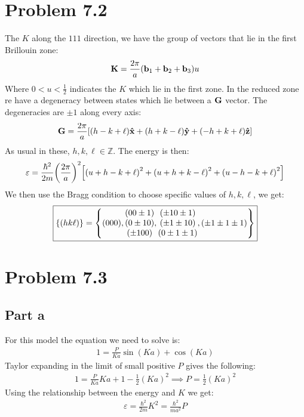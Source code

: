 \documentclass[12pt]{article}
\begin{document}
\section{Problem 7.2}
The $K$ along the $111$ direction, we have the group of vectors that lie in the first Brillouin zone:
\begin{align*}
  \vb{K}=\frac{2\pi}{a}\qty(\vb{b}_1+\vb{b}_2+\vb{b}_3)u
\end{align*}
Where $0<u<\frac{1}{2}$ indicates the $K$ which lie in the first zone. In the reduced zone re have a degeneracy between states which lie between a $\vb{G}$ vector. The degeneracies are $\pm 1$ along every axis:
\begin{align*}
  \vb{G}=\frac{2\pi}{a}
  \qty[\qty(h-k+\ell)\vu{x}+\qty(h+k-\ell)\vu{y}+\qty(-h+k+\ell)\vu{z}]
\end{align*}
As usual in these, $h,k,\ell\in\mathbb{Z}$. The energy is then:
\begin{align*}
  \varepsilon=\frac{\hbar^2}{2m}\qty(\frac{2\pi}{a})^2
  \qty[\qty(u+h-k+\ell)^2+\qty(u+h+k-\ell)^2+\qty(u-h-k+\ell)^2]
\end{align*}
We then use the Bragg condition to choose specific values of $h,k,\ell$, we get:
\begin{align*}
  \boxed{\{(hk\ell)\}=\qty{(000),
    \mqty{(00\pm1)\\(0\pm10)\\(\pm100)},
    \mqty{(\pm10\pm1)\\(\pm1\pm10)\\(0\pm1\pm1)},
    (\pm1\pm1\pm1)}}
\end{align*}
\section{Problem 7.3}
\subsection{Part a}
For this model the equation we need to solve is:
\begin{align*}
  1=\frac{P}{Ka}\sin(Ka)+\cos(Ka)
\end{align*}
Taylor expanding in the limit of small positive $P$ gives the following:
\begin{align*}
  1=\frac{P}{Ka}Ka+1-\frac{1}{2}(Ka)^2\implies P=\frac{1}{2}(Ka)^2
\end{align*}
Using the relationship between the energy and $K$ we get:
\begin{align*}
  \varepsilon = \frac{\hbar^2}{2m}K^2 = \boxed{\frac{\hbar^2}{ma^2}P}
\end{align*}
\end{document}
